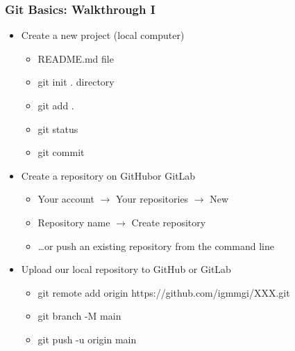 \documentclass[t]{beamer}
\begin{document}
\begin{frame}[fragile]
    \frametitle{Git Basics: Walkthrough I}
    \begin{itemize}
        \item Create a new project (local computer)
            \begin{itemize}\scriptsize
                \item README.md file
                \item git init . directory
                \item git add .
                \item git status 
                \item git commit 
            \end{itemize}
        \item Create a repository on GitHub\footnotemark or GitLab
            \begin{itemize}\scriptsize
                \item Your account $\rightarrow$ Your repositories $\rightarrow$ New 
                \item Repository name $\rightarrow$ Create repository
                \item …or push an existing repository from the command line
            \end{itemize}
        \item Upload our local repository to GitHub or GitLab
            \begin{itemize}\scriptsize
                \item git remote add origin https://github.com/igmmgi/XXX.git
                \item git branch -M main\footnotemark
                \item git push -u origin main
            \end{itemize}
    \end{itemize}
\end{frame}
\end{document}
